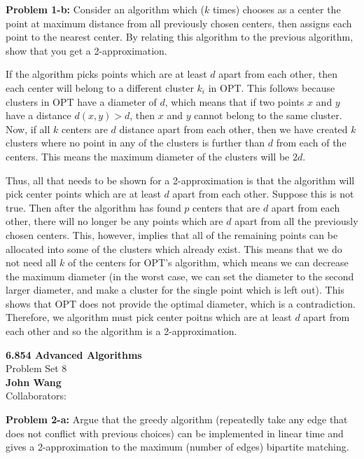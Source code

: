 \documentclass[psamsfonts]{amsart}
\newenvironment{sol}{\vspace{0.25cm}{\large \bfseries Solution:}}{\qedsymbol}
\newenvironment{prob}[1]{\begin{framed}{\large \bfseries Problem #1:}}{\end{framed}}
\newcommand{\makenewtitle}{
    \begin{center}
    {\huge \bfseries 6.854 Advanced Algorithms} \\
    Problem Set 8\\
    \vspace{0.25cm}
    {\bfseries John Wang} \\
    Collaborators:  
    \end{center}
    \vspace{0.5cm}
}
\begin{document}
\begin{prob}{1-b}
Consider an algorithm which ($k$ times) chooses as a center the point at maximum distance from all previously chosen centers, then assigns each point to the nearest center. By relating this algorithm to the previous algorithm, show that you get a 2-approximation.
\end{prob}
\begin{sol}
If the algorithm picks points which are at least $d$ apart from each other, then each center will belong to a different cluster $k_i$ in OPT. This follows because clusters in OPT have a diameter of $d$, which means that if two points $x$ and $y$ have a distance $d(x,y) > d$, then $x$ and $y$ cannot belong to the same cluster. Now, if all $k$ centers are $d$ distance apart from each other, then we have created $k$ clusters where no point in any of the clusters is further than $d$ from each of the centers. This means the maximum diameter of the clusters will be $2d$.

Thus, all that needs to be shown for a 2-approximation is that the algorithm will pick center points which are at least $d$ apart from each other. Suppose this is not true. Then after the algorithm has found $p$ centers that are $d$ apart from each other, there will no longer be any points which are $d$ apart from all the previously chosen centers. This, however, implies that all of the remaining points can be allocated into some of the clusters which already exist. This means that we do not need all $k$ of the centers for OPT's algorithm, which means we can decrease the maximum diameter (in the worst case, we can set the diameter to the second larger diameter, and make a cluster for the single point which is left out). This shows that OPT does not provide the optimal diameter, which is a contradiction. Therefore, we algorithm must pick center poitns which are at least $d$ apart from each other and so the algorithm is a 2-approximation.
\end{sol}

\newpage
\makenewtitle

\begin{prob}{2-a}
Argue that the greedy algorithm (repeatedly take any edge that does not conflict with previous choices) can be implemented in linear time and gives a 2-approximation to the maximum (number of edges) bipartite matching.
\end{prob}
\end{document}

